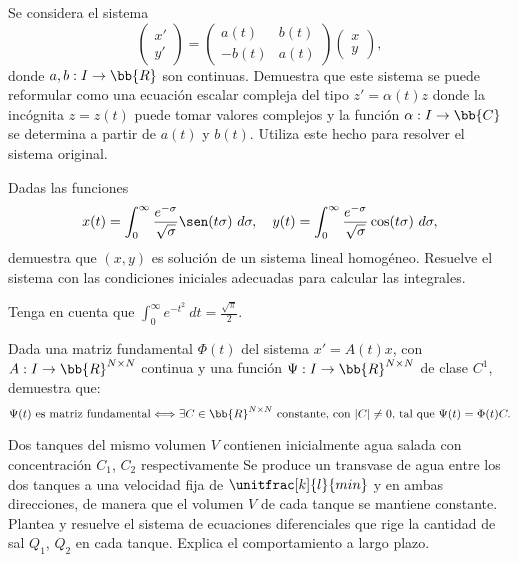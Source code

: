 \begin{ejercicio}\label{ej:5.5}
    Se considera el sistema
    \[
        \begin{pmatrix}
            x'\\
            y'
        \end{pmatrix}
        =
        \begin{pmatrix}
            a(t) & b(t)\\
            -b(t) & a(t)
        \end{pmatrix}
        \begin{pmatrix}
            x\\
            y
        \end{pmatrix},
    \]
    donde $a, b : I \to \bb{R}$ son continuas. Demuestra que este sistema se puede reformular como una ecuación escalar compleja del tipo $z' = \alpha(t)z$ donde la incógnita $z = z(t)$ puede tomar valores complejos y la función $\alpha : I \to \bb{C}$ se determina a partir de $a(t)$ y $b(t)$. Utiliza este hecho para resolver el sistema original.
\end{ejercicio}

\begin{ejercicio}\label{ej:5.6}
    Dadas las funciones
    \[
        x(t) = \int_0^\infty \frac{e^{-\sigma}}{\sqrt{\sigma}}\sen(t\sigma)~d\sigma, \quad y(t) = \int_0^\infty \frac{e^{-\sigma}}{\sqrt{\sigma}}\cos(t\sigma)~d\sigma,
    \]
    demuestra que $(x, y)$ es solución de un sistema lineal homogéneo. Resuelve el sistema con las condiciones iniciales adecuadas para calcular las integrales.
    \begin{observacion}
        Tenga en cuenta que
        $\displaystyle \int_0^\infty e^{-t^2}~dt = \frac{\sqrt{\pi}}{2}$.
    \end{observacion}
\end{ejercicio}

\begin{ejercicio}\label{ej:5.7}
    Dada una matriz fundamental $\Phi(t)$ del sistema $x' = A(t)x$, con $A : I \to \bb{R}^{N\times N}$ continua y una función $\Psi : I \to \bb{R}^{N\times N}$ de clase $C^1$, demuestra que:
    \[
        \Psi(t) \text{ es matriz fundamental} \Longleftrightarrow \exists C \in \bb{R}^{N\times N} \text{ constante, con } |C|\neq 0 \text{, tal que } \Psi(t) = \Phi(t)C.
    \]
\end{ejercicio}

\begin{ejercicio}\label{ej:5.8}
    Dos tanques del mismo volumen $V$ contienen inicialmente agua salada con concentración $C_1$, $C_2$ respectivamente
    Se produce un transvase de agua entre los dos tanques a una velocidad fija de $\unitfrac[k]{l}{min}$ y en ambas direcciones, de manera que el volumen $V$ de cada tanque se mantiene constante. Plantea y resuelve el sistema de ecuaciones diferenciales que rige la cantidad de sal $Q_1$, $Q_2$ en cada tanque. Explica el comportamiento a largo plazo.
\end{ejercicio}

